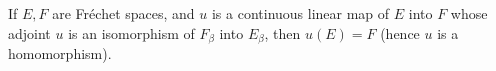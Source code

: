 If $E, F$ are Fréchet spaces, and $u$ is a continuous linear map of $E$ into $F$ whose adjoint $u$ is an isomorphism of $F_\beta$ into $E_\beta$, then $u(E) = F$ (hence $u$ is a homomorphism).